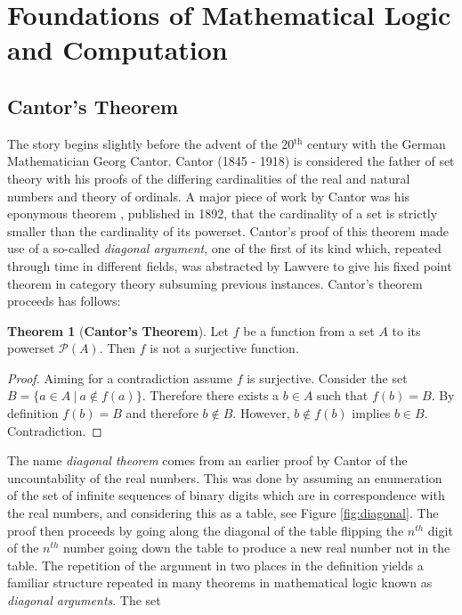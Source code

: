 \theoremstyle{definition}
\newtheorem{theorem}{Theorem}
\newtheorem*{theorem*}{Theorem}
\newtheorem{definition}{Definition}
\newtheorem*{definition*}{Definition}

\section{Foundations of Mathematical Logic and Computation}

\subsection{Cantor's Theorem}

The story begins slightly before the advent of the 20$^{\textrm{th}}$ century
with the German Mathematician Georg Cantor. Cantor (1845 - 1918) is considered
the father of set theory with his proofs of the differing cardinalities of the
real and natural numbers and theory of ordinals. A major piece of work by Cantor
was his eponymous theorem \cite{cantor1892ueber}, published in 1892, that the
cardinality of a set is strictly smaller than the cardinality of its powerset.
Cantor's proof of this theorem made use of a so-called \textit{diagonal
argument}, one of the first of its kind which, repeated through time in
different fields, was abstracted by Lawvere to give his fixed point theorem in
category theory subsuming previous instances. Cantor's theorem proceeds has
follows:

\begin{theorem*}[\textbf{Cantor's Theorem}]
    Let $f$ be a function from a set $A$ to its powerset $\mathcal{P}(A)$. Then
    $f$ is not a surjective function.
\end{theorem*}

\begin{proof}
    Aiming for a contradiction assume $f$ is surjective. Consider the set $B =
    \{ a \in A \: | \: a \not\in f(a) \}$. Therefore there exists a $b \in A$
    such that $f(b)=B$. By definition $f(b) = B$ and therefore $b \not\in B$.
    However, $b \not\in f(b)$ implies $b \in B$. Contradiction.
\end{proof}

The name \textit{diagonal theorem} comes from an earlier proof by Cantor of the
uncountability of the real numbers. This was done by assuming an enumeration of
the set of infinite sequences of binary digits which are in correspondence with
the real numbers, and considering this as a table, see Figure
\ref{fig:diagonal}. The proof then proceeds by going along the diagonal of the
table flipping the $n^{th}$ digit of the $n^{th}$ number going down the table to
produce a new real number not in the table. The repetition of the argument in
two places in the definition yields a familiar structure repeated in many
theorems in mathematical logic known as \textit{diagonal arguments}. The set

